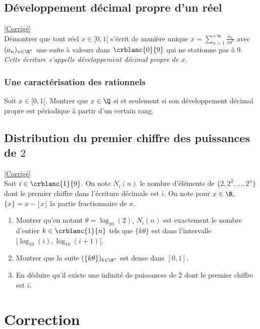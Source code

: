 \documentclass[8pt]{book}
\begin{document}
\section{Développement décimal propre d'un réel }
\label{Développement décimal propre d'un réel}
\textcolor{blue}{\hyperref[Développement décimal propre d'un réel corrigé]{[Corrigé]}}\\
Démontrer que tout réel $x\in [0,1[$ s'écrit de manière unique $x=\displaystyle\sum_{n=1}^{+\infty}\frac{a_n}{10^n}$ avec $(a_n)_{n\in \N^*}$ une suite à valeurs dans $\crblanc{0}{9}$ qui ne stationne pas à $9$.\\
\textit{Cette écriture s'appelle développement décimal propre de $x$.}

\subsection{Une caractérisation des rationnels }
Soit $x\in [0,1[$. Montrer que $x\in \Q$ si et seulement si son développement décimal propre est périodique à partir d'un certain rang.

\section{Distribution du premier chiffre des puissances de $2$ }
\label{Distribution du premier chiffre des puissances de 2}
\textcolor{blue}{\hyperref[Distribution du premier chiffre des puissances de 2 corrigé]{[Corrigé]}}\\
Soit $i\in \crblanc{1}{9}$. On note $N_i(n)$ le nombre d'éléments de $\{2,2^2,\dots,2^n\}$ dont le premier chiffre dans l'écriture décimale est $i$. On note pour $x\in \R$, $\{x\}=x-\lfloor x\rfloor$ la partie fractionnaire de $x$.
\begin{enumerate}
	\item Montrer qu'en notant $\theta=\log_{10}(2)$, $N_i(n)$ est exactement le nombre d'entier $k\in \crblanc{1}{n}$ tels que $\{k\theta\}$ est dans l'intervalle $[\log_{10}(i),\log_{10}(i+1)[$.
	\item Montrer que la suite $(\{k\theta\})_{k\in \N^*}$ est dense dans $[0,1]$.
	\item En déduire qu'il existe une infinité de puissances de $2$ dont le premier chiffre est $i$.
\end{enumerate}

\chapter{Correction}
\end{document}
